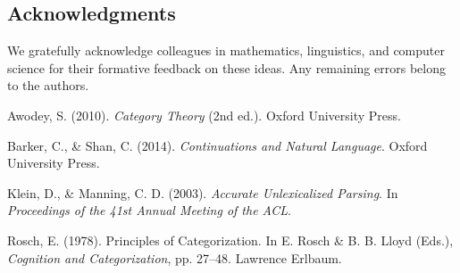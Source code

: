 \documentclass[12pt]{article}
\theoremstyle{plain}
\theoremstyle{definition}
\begin{document}
\subsection*{Acknowledgments}
We gratefully acknowledge colleagues in mathematics, linguistics, and computer science for their formative feedback on these ideas. Any remaining errors belong to the authors.

\begin{thebibliography}{99}

Awodey, S. (2010). \textit{Category Theory} (2nd ed.). Oxford University Press.

Barker, C., \& Shan, C. (2014). \textit{Continuations and Natural Language}. Oxford University Press.

Klein, D., \& Manning, C. D. (2003). \textit{Accurate Unlexicalized Parsing}. In \textit{Proceedings of the 41st Annual Meeting of the ACL}.

Rosch, E. (1978). Principles of Categorization. In E. Rosch \& B. B. Lloyd (Eds.), 
\textit{Cognition and Categorization}, pp. 27--48. Lawrence Erlbaum.

\end{thebibliography}
\end{document}
